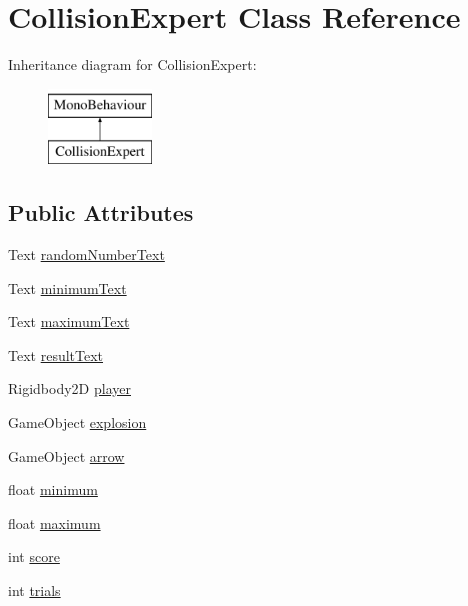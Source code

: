 \hypertarget{classCollisionExpert}{}\section{Collision\+Expert Class Reference}
\label{classCollisionExpert}
Inheritance diagram for Collision\+Expert\+:\begin{figure}[H]
\begin{center}
\leavevmode
\includegraphics[height=2.000000cm]{classCollisionExpert}
\end{center}
\end{figure}
\subsection*{Public Attributes}
\begin{DoxyCompactItemize}
\item 
Text \hyperlink{classCollisionExpert_ae3561a01b795d8f34dfc8f5e6e2e49ab}{random\+Number\+Text}
\item 
Text \hyperlink{classCollisionExpert_a26f1710d3c74fa454d6d327eaae8a15a}{minimum\+Text}
\item 
Text \hyperlink{classCollisionExpert_ae958efa8a69fd01dbe418a3c4fdb6aa2}{maximum\+Text}
\item 
Text \hyperlink{classCollisionExpert_a5e2c6efb803c54f5bdb3cdb6e9890522}{result\+Text}
\item 
Rigidbody2D \hyperlink{classCollisionExpert_a455a21ecf89d75a65e8f0d79358d1afe}{player}
\item 
Game\+Object \hyperlink{classCollisionExpert_ada8a7f3badca3ef8f4cea6ed93a85027}{explosion}
\item 
Game\+Object \hyperlink{classCollisionExpert_ae302e5919a07024b5fc81ca6d50a0af4}{arrow}
\item 
float \hyperlink{classCollisionExpert_a96829bc02428028b583965a3d7f5f3c3}{minimum}
\item 
float \hyperlink{classCollisionExpert_a4c12b35e9d2cb38a305a50a397180537}{maximum}
\item 
int \hyperlink{classCollisionExpert_ae423c52c019102ab80ce418978496795}{score}
\item 
int \hyperlink{classCollisionExpert_a78ec1e1a2415839d0196b9bd8b90adb2}{trials}
\end{DoxyCompactItemize}
